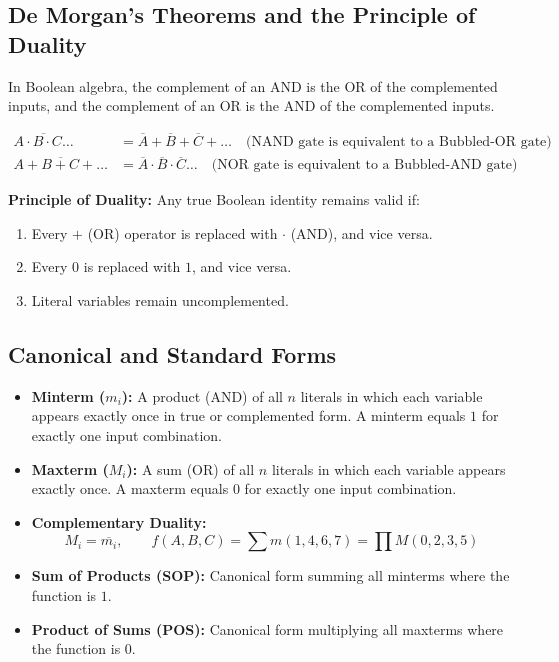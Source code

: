 \documentclass[12pt,a4paper]{article}
\begin{document}
\subsection{De Morgan's Theorems and the Principle of Duality}
\begin{tcolorbox}[defbox, title={De Morgan's Theorems}]
In Boolean algebra, the complement of an AND is the OR of the complemented inputs, and the complement of an OR is the AND of the complemented inputs.
\end{tcolorbox}

\begin{tcolorbox}[formulabox, title={\textbf{De Morgan's Theorems}}]
\begin{align}
  \overline{A \cdot B \cdot C \dots} &= \overline{A} + \overline{B} + \overline{C} + \dots \quad \text{(NAND gate is equivalent to a Bubbled-OR gate)} \\
  \overline{A + B + C + \dots} &= \overline{A} \cdot \overline{B} \cdot \overline{C} \dots \quad \text{(NOR gate is equivalent to a Bubbled-AND gate)}
\end{align}
\end{tcolorbox}

\textbf{Principle of Duality:} Any true Boolean identity remains valid if:
\begin{enumerate}[label=\alph*., leftmargin=*]
  \item Every $+$ (OR) operator is replaced with $\cdot$ (AND), and vice versa.
  \item Every $0$ is replaced with $1$, and vice versa.
  \item Literal variables remain uncomplemented.
\end{enumerate}

\subsection{Canonical and Standard Forms}
\begin{itemize}[leftmargin=*, itemsep=3pt]
  \item \textbf{Minterm ($m_i$):} A product (AND) of all $n$ literals in which each variable appears exactly once in true or complemented form. A minterm equals $1$ for exactly one input combination.
  \item \textbf{Maxterm ($M_i$):} A sum (OR) of all $n$ literals in which each variable appears exactly once. A maxterm equals $0$ for exactly one input combination.
  \item \textbf{Complementary Duality:}
  \begin{equation}
    M_i = \overline{m_i}, \qquad f(A, B, C) = \sum m(1, 4, 6, 7) = \prod M(0, 2, 3, 5)
  \end{equation}
  \item \textbf{Sum of Products (SOP):} Canonical form summing all minterms where the function is $1$.
  \item \textbf{Product of Sums (POS):} Canonical form multiplying all maxterms where the function is $0$.
\end{itemize}
\end{document}
